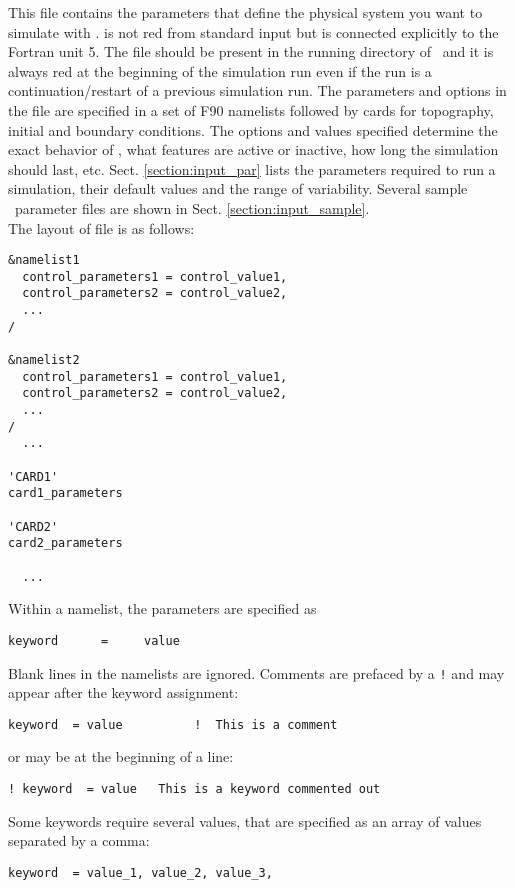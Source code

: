 This file contains the parameters that define the physical system
you want to simulate with \PDAC.  is not red from standard 
input but is connected explicitly to the Fortran unit 5. The file should
be present in the running directory of \PDAC\, and it is always red
at the beginning of the simulation run even if the run is a 
continuation/restart of a previous simulation run. 
The parameters and options in the  file are specified
in a set of F90 namelists followed by cards for topography, 
initial and boundary conditions.
The options and values specified determine the exact behavior of
\PDAC, what features are active or inactive, how long the simulation
should last, etc.  
Sect. \ref{section:input_par} lists the parameters required to run a 
simulation, their default values and the range of variability.
Several sample \PDAC\ parameter files are shown in Sect. 
\ref{section:input_sample}.\\

The layout of  file is as follows:

\begin{verbatim}
&namelist1
  control_parameters1 = control_value1,
  control_parameters2 = control_value2,
  ...
/

&namelist2
  control_parameters1 = control_value1,
  control_parameters2 = control_value2,
  ...
/
  ...

'CARD1'
card1_parameters

'CARD2'
card2_parameters

  ...

\end{verbatim}

Within a namelist, the parameters are specified as
\begin{verbatim}
keyword      =     value
\end{verbatim}
Blank lines in the namelists are ignored.  Comments are prefaced by
a {\tt !} and may appear after the keyword assignment:
\begin{verbatim}
keyword  = value          !  This is a comment
\end{verbatim}
or may be at the beginning of a line:
\begin{verbatim}
! keyword  = value   This is a keyword commented out
\end{verbatim}
Some keywords require several values, that are specified as an array of values
separated by a comma:
\begin{verbatim}
keyword  = value_1, value_2, value_3,
\end{verbatim}

